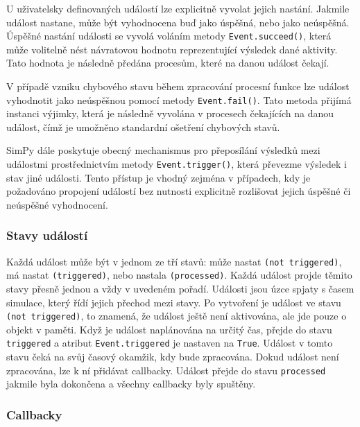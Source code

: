 \documentclass[
  program=itp,
  biblatex,
  figures=false,
  glossaries,
  index
]{kidiplom}
\begin{document}
U uživatelsky definovaných událostí lze explicitně vyvolat jejich nastání. Jakmile událost nastane, může být vyhodnocena buď jako úspěšná, nebo jako neúspěšná. Úspěšné nastání události se vyvolá voláním metody \texttt{Event.succeed()}, která může volitelně nést návratovou hodnotu reprezentující výsledek dané aktivity. Tato hodnota je následně předána procesům, které na danou událost čekají.

V případě vzniku chybového stavu během zpracování procesní funkce lze událost vyhodnotit jako neúspěšnou pomocí metody \texttt{Event.fail()}. Tato metoda přijímá instanci výjimky, která je následně vyvolána v procesech čekajících na danou událost, čímž je umožněno standardní ošetření chybových stavů.

SimPy dále poskytuje obecný mechanismus pro přeposílání výsledků mezi událostmi prostřednictvím metody \texttt{Event.trigger()}, která převezme výsledek i stav jiné události. Tento přístup je vhodný zejména v případech, kdy je požadováno propojení událostí bez nutnosti explicitně rozlišovat jejich úspěšné či neúspěšné vyhodnocení.

\subsubsection{Stavy událostí}

Každá událost může být v jednom ze tří stavů: může nastat \texttt{(not triggered)}, má nastat \texttt{(triggered)}, nebo nastala \texttt{(processed)}. Každá událost projde těmito stavy přesně jednou a vždy v uvedeném pořadí. Události jsou úzce spjaty s časem simulace, který řídí jejich přechod mezi stavy. Po vytvoření je událost ve stavu \texttt{(not triggered)}, to znamená, že událost ještě není aktivována, ale jde pouze o objekt v paměti. Když je událost naplánována na určitý čas, přejde do stavu \texttt{triggered} a atribut \texttt{Event.triggered} je nastaven na \texttt{True}. Událost v tomto stavu čeká na svůj časový okamžik, kdy bude zpracována. Dokud událost není zpracována, lze k ní přidávat callbacky. Událost přejde do stavu  \texttt{processed} jakmile byla dokončena a všechny callbacky byly spuštěny.

\subsubsection{Callbacky}
\end{document}

